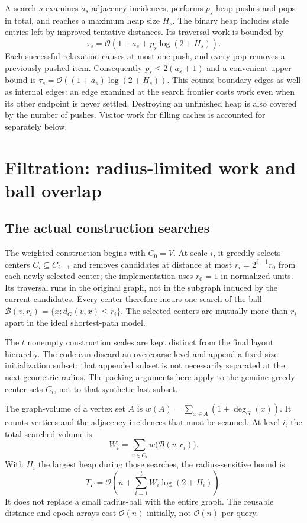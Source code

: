 \documentclass[11pt,a4paper]{article}
\newcommand{\bigO}{\mathcal O}
\newcommand{\ball}{\mathcal B}
\begin{document}
A search $s$ examines $a_s$ adjacency incidences, performs $p_s$ heap pushes and
pops in total, and reaches a maximum heap size $H_s$. The binary heap includes
stale entries left by improved tentative distances. Its traversal work is
bounded by
\begin{equation}
 \tau_s=\bigO\!\left(1+a_s+p_s\log(2+H_s)\right).
 \label{eq:query}
\end{equation}
Each successful relaxation causes at most one push, and every pop removes a
previously pushed item. Consequently $p_s\leq 2(a_s+1)$ and a convenient upper
bound is $\tau_s=\bigO((1+a_s)\log(2+H_s))$. This counts boundary edges as well
as internal edges: an edge examined at the search frontier costs work even when
its other endpoint is never settled. Destroying an unfinished heap is also
covered by the number of pushes. Visitor work for filling caches is accounted
for separately below.

\clearpage
\section{Filtration: radius-limited work and ball overlap}

\subsection{The actual construction searches}

The weighted construction begins with $C_0=V$. At scale $i$, it greedily selects
centers $C_i\subseteq C_{i-1}$ and removes candidates at distance at most
$r_i=2^{i-1}r_0$ from each newly selected center; the implementation uses
$r_0=1$ in normalized units. Its traversal runs in the original graph, not in
the subgraph induced by the current candidates. Every center therefore incurs
one search of the ball $\ball(v,r_i)=\{x:d_G(v,x)\leq r_i\}$. The selected centers
are mutually more than $r_i$ apart in the ideal shortest-path model.

The $t$ nonempty construction scales are kept distinct from the final layout
hierarchy. The code can discard an overcoarse level and append a fixed-size
initialization subset; that appended subset is not necessarily separated at
the next geometric radius. The packing arguments here apply to the genuine
greedy center sets $C_i$, not to that synthetic last subset.

The graph-volume of a vertex set $A$ is
$w(A)=\sum_{x\in A}(1+\deg_G(x))$. It counts vertices and the adjacency
incidences that must be scanned. At level $i$, the total searched volume is
\begin{equation}
 W_i=\sum_{v\in C_i} w\bigl(\ball(v,r_i)\bigr).
 \label{eq:volume}
\end{equation}
With $H_i$ the largest heap during those searches, the radius-sensitive bound is
\begin{equation}
 T_F=\bigO\!\left(n+\sum_{i=1}^{t} W_i\log(2+H_i)\right).
 \label{eq:filtration}
\end{equation}
It does not replace a small radius-ball with the entire graph. The reusable
distance and epoch arrays cost $\bigO(n)$ initially, not $\bigO(n)$ per query.
\end{document}
